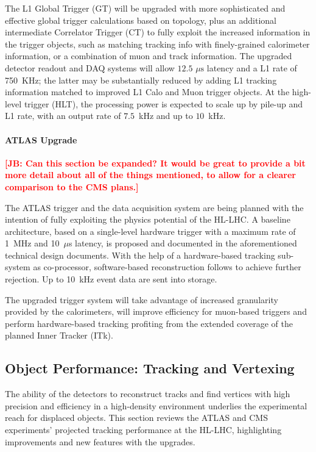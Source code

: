 The L1 Global Trigger (GT) will be upgraded with more sophisticated and effective global trigger calculations based on topology, plus an additional intermediate Correlator Trigger (CT) to fully exploit the increased information in the trigger objects, such as matching tracking info with finely-grained calorimeter information, or a combination of muon and track information. The upgraded detector readout and DAQ systems will allow $12.5\,\, \mu \mathrm{s}$ latency and a L1 rate of 750~KHz; the latter may be substantially reduced by adding L1 tracking information matched to improved L1 Calo and Muon trigger objects. At the high-level trigger (HLT), the processing power is expected to scale up by pile-up and L1 rate, with an output rate of $7.5$~kHz and up to $10$~kHz. 

\paragraph{ATLAS Upgrade}

{\bf \textcolor{red}{[JB: Can this section be expanded?  It would be great to provide a bit more detail about all of the things mentioned, to allow for a clearer comparison to the CMS plans.]}}

The ATLAS trigger and the data acquisition system are being planned with the intention of fully exploiting the physics potential of the HL-LHC. A baseline architecture, based on a single-level hardware trigger with a maximum rate of 1~MHz and 10~$\mu$s latency, is proposed and documented in the aforementioned technical design documents. With the help of a hardware-based tracking sub-system as co-processor, software-based reconstruction follows to achieve further rejection. Up to 10~kHz event data are sent into storage.

The upgraded trigger system will take advantage of increased granularity provided by the calorimeters, will improve efficiency for muon-based triggers and perform hardware-based tracking profiting from the extended coverage of the planned Inner Tracker (ITk). 

\subsection{Object Performance: Tracking and Vertexing} \label{sec:upgradeobject}

The ability of the detectors to reconstruct tracks and find vertices with high precision and efficiency in a high-density environment underlies the experimental reach for displaced objects. This section reviews the ATLAS and CMS experiments' projected tracking performance at the HL-LHC, highlighting improvements and new features with the upgrades.

